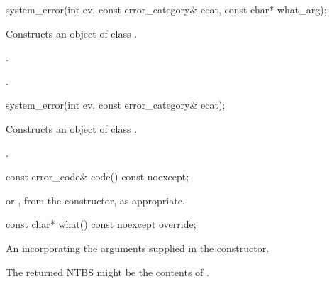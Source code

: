 %
\begin{itemdecl}
system_error(int ev, const error_category& ecat,
  const char* what_arg);
\end{itemdecl}

\begin{itemdescr}
\pnum
\effects Constructs an object of class .

\pnum
\postconditions {}.

.
\end{itemdescr}

%
\begin{itemdecl}
system_error(int ev, const error_category& ecat);
\end{itemdecl}

\begin{itemdescr}
\pnum
\effects Constructs an object of class .

\pnum
\postconditions {}.
\end{itemdescr}

%
\begin{itemdecl}
const error_code& code() const noexcept;
\end{itemdecl}

\begin{itemdescr}
\pnum
\returns {} or , from the constructor,
as appropriate.
\end{itemdescr}

%
\begin{itemdecl}
const char* what() const noexcept override;
\end{itemdecl}

\begin{itemdescr}
\pnum
\returns An \ntbs incorporating the arguments supplied in the constructor.

\begin{note} The returned NTBS might be the contents of .\end{note}
\end{itemdescr}
